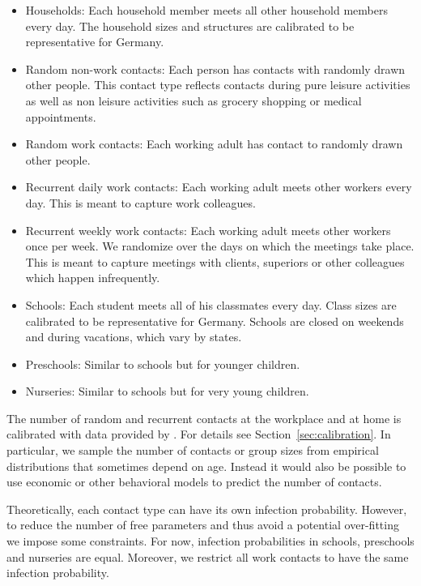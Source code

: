 \begin{itemize}
    \item Households: Each household member meets all other household members every day. The household sizes and structures are calibrated to be representative for Germany.
    \item Random non-work contacts: Each person has contacts with randomly drawn other people. This contact type reflects contacts during pure leisure activities as well as non leisure activities such as grocery shopping or medical appointments.
    \item Random work contacts: Each working adult has contact to randomly drawn other people.
    \item Recurrent daily work contacts: Each working adult meets other workers every day. This is meant to capture work colleagues.
    \item Recurrent weekly work contacts: Each working adult meets other workers once per week. We randomize over the days on which the meetings take place. This is meant to capture meetings with clients, superiors or other colleagues which happen infrequently.
    \item Schools: Each student meets all of his classmates every day. Class sizes are calibrated to be representative for Germany. Schools are closed on weekends and during vacations, which vary by states.
    \item Preschools: Similar to schools but for younger children.
    \item Nurseries: Similar to schools but for very young children.
\end{itemize}


The number of random and recurrent contacts at the workplace and at home is calibrated with data provided by \cite{Mossong2008}. For details see Section~\ref{sec:calibration}. In particular, we sample the number of contacts or group sizes from empirical distributions that sometimes depend on age. Instead it would also be possible to use economic or other behavioral models to predict the number of contacts.

Theoretically, each contact type can have its own infection probability. However, to reduce the number of free parameters and thus avoid a potential over-fitting we impose some constraints. For now, infection probabilities in schools, preschools and nurseries are equal. Moreover, we restrict all work contacts to have the same infection probability.
